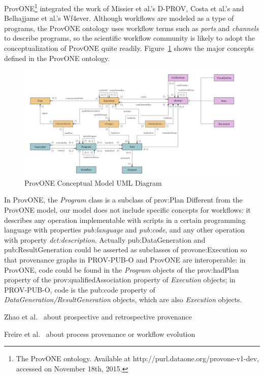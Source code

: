 ProvONE\footnote{The ProvONE ontology. Available at http://purl.dataone.org/provone-v1-dev, accessed on November 18th, 2015.} integrated the work of Missier et al.'s D-PROV, Costa et al.'s and Belhajjame et al.'s Wf4ever. Although workflows are modeled as a type of programs, the ProvONE ontology uses workflow terms such as \emph{ports} and \emph{channels} to describe programs, so the scientific workflow community is likely to adopt the conceptualization of ProvONE quite readily. Figure~\ref{fig:provone} shows the major concepts defined in the ProvONE ontology.
\begin{figure}
	\centering
	\includegraphics[width=\textwidth]{provone.png}
	\caption{ProvONE Conceptual Model UML Diagram}
	\label{fig:provone}
\end{figure}
In ProvONE, the \emph{Program} class is a subclass of prov:Plan
Different from the ProvONE model, our model does not include specific concepts for workflows: it describes any operation implementable with scripts in a certain programming language with properties \emph{pub:language} and \emph{pub:code}, and any other operation with property \emph{dct:description}. Actually pub:DataGeneration and pub:ResultGeneration could be asserted as subclasses of provone:Execution so that provenance graphs in PROV-PUB-O and ProvONE are interoperable: in ProvONE, code could be found in the \emph{Program} objects of the prov:hadPlan property of the prov:qualifiedAssociation property of \emph{Execution} objects; in PROV-PUB-O, code is the pub:code property of \emph{DataGeneration/ResultGeneration} objects, which are also \emph{Execution} objects. 

Zhao et al.~\cite{zhao2006applying} about prospective and retrospective provenance

Freire et al.~\cite{freire2006managing} about process provenance or workflow evolution

